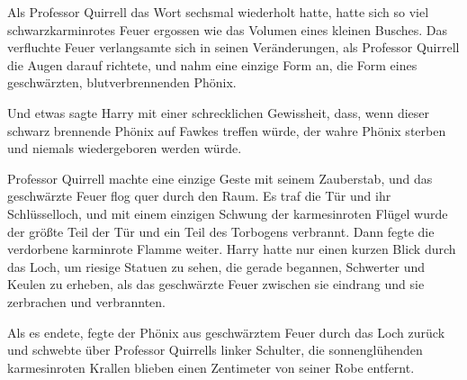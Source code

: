 Als Professor Quirrell das Wort sechsmal wiederholt hatte, hatte sich so viel schwarzkarminrotes Feuer ergossen wie das Volumen eines kleinen Busches. Das verfluchte Feuer verlangsamte sich in seinen Veränderungen, als Professor Quirrell die Augen darauf richtete, und nahm eine einzige Form an, die Form eines geschwärzten, blutverbrennenden Phönix.

Und etwas sagte Harry mit einer schrecklichen Gewissheit, dass, wenn dieser schwarz brennende Phönix auf Fawkes treffen würde, der wahre Phönix sterben und niemals wiedergeboren werden würde.

Professor Quirrell machte eine einzige Geste mit seinem Zauberstab, und das geschwärzte Feuer flog quer durch den Raum. Es traf die Tür und ihr Schlüsselloch, und mit einem einzigen Schwung der karmesinroten Flügel wurde der größte Teil der Tür und ein Teil des Torbogens verbrannt. Dann fegte die verdorbene karminrote Flamme weiter.
Harry hatte nur einen kurzen Blick durch das Loch, um riesige Statuen zu sehen, die gerade begannen, Schwerter und Keulen zu erheben, als das geschwärzte Feuer zwischen sie eindrang und sie zerbrachen und verbrannten.

Als es endete, fegte der Phönix aus geschwärztem Feuer durch das Loch zurück und schwebte über Professor Quirrells linker Schulter, die sonnenglühenden karmesinroten Krallen blieben einen Zentimeter von seiner Robe entfernt.

